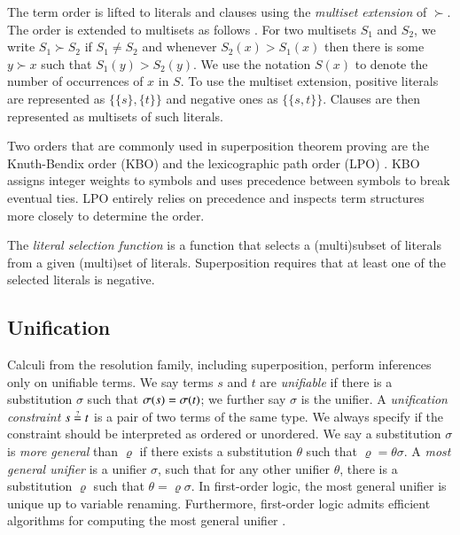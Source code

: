 The term order is lifted to literals and clauses using the {\em multiset extension} of
$\succ$. The order is extended to multisets as follows
\cite[Sect.~2.5]{bg-01-resolution}. For two multisets $S_1$ and $S_2$, we write $S_1 \succ S_2$ if $S_1 \not= S_2$
and whenever $S_2(x) > S_1(x)$ then there is some $y \succ x$ such that $S_1(y)
> S_2(y)$. We use the notation $S(x)$ to denote the number of occurrences of $x$ in
$S$. To use the  multiset extension, positive literals are represented as $ \{ \{s\},
\{t\} \}$ and negative ones as $\{ \{ s, t \} \}$. Clauses are then represented as 
multisets of such literals. 

Two orders that are commonly used in superposition theorem proving are the
Knuth-Bendix order (KBO) \cite[Sect.~5.4.4]{bn-98-tr-and-all-that} and the
lexicographic path order (LPO) \cite[Sect.~5.4.2]{bn-98-tr-and-all-that}.
KBO assigns integer weights to symbols and uses precedence between symbols to
break eventual ties. LPO entirely relies on precedence and inspects term
structures more closely to determine the order. 

\newcommand{\selfun}{\ensuremath{\mathit{Sel}}}
The {\em literal selection function} is a function that selects a (multi)subset of literals
from a given (multi)set of literals. Superposition requires that at least one of the selected literals is negative. 

\subsection{Unification}
\label{sec:pre:unif}

Calculi from the resolution family, including superposition, perform inferences
only on unifiable terms. We say terms $s$ and $t$ are {\em unifiable} if there is a
substitution $\sigma$ such that $\sigma(s) = \sigma(t)$; we further say
$\sigma$ is the unifier. A \emph{unification constraint} $s \unif t$ is a pair of two terms of the same type. 
We always specify if the constraint should be interpreted as ordered or unordered.
We say a substitution $\sigma$ is \emph{more general} than $\varrho$ if there exists a substitution $\theta$
such that $\varrho = \theta\sigma$.
A \emph{most general unifier} is a
unifier $\sigma$, such that for any other unifier $\theta$, there is a
substitution $\varrho$ such that $\theta = \varrho\sigma$. In first-order logic,
the most general unifier is unique up to variable renaming. Furthermore,
first-order logic admits efficient algorithms for computing the most general
unifier \cite{hv-09-unifalgs}.

